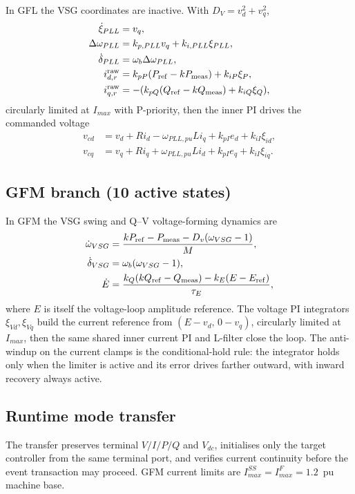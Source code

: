 \documentclass[12pt,a4paper]{article}
\begin{document}
In GFL the VSG coordinates are inactive.  With $D_V=v_d^2+v_q^2$,
\begin{align}
\dot\xi_{PLL}&=v_q,\\
\Delta\omega_{PLL}&=k_{p,PLL}v_q+k_{i,PLL}\xi_{PLL},\\
\dot\delta_{PLL}&=\omega_b\Delta\omega_{PLL},\\
i_{d,r}^{\rm raw}&=k_{pP}(P_{\rm ref}-k P_{\rm meas})+k_{iP}\xi_P,\\
i_{q,r}^{\rm raw}&=-(k_{pQ}(Q_{\rm ref}-k Q_{\rm meas})+k_{iQ}\xi_Q),
\end{align}
circularly limited at $I_{max}$ with P-priority, then the inner PI drives the
commanded voltage
\begin{align}
v_{cd}&=v_d+R i_d-\omega_{PLL,pu}L i_q+k_{pI}e_d+k_{iI}\xi_{id},\\
v_{cq}&=v_q+R i_q+\omega_{PLL,pu}L i_d+k_{pI}e_q+k_{iI}\xi_{iq}.
\end{align}

\subsection{GFM branch (10 active states)}

In GFM the VSG swing and Q--V voltage-forming dynamics are
\begin{align}
\dot\omega_{VSG}&=\frac{k P_{\rm ref}-P_{\rm meas}-D_v(\omega_{VSG}-1)}{M},\\
\dot\delta_{VSG}&=\omega_b(\omega_{VSG}-1),\\
\dot E&=\frac{k_Q(k Q_{\rm ref}-Q_{\rm meas})-k_E(E-E_{\rm ref})}{\tau_E},
\end{align}
where $E$ is itself the voltage-loop amplitude reference.  The voltage PI
integrators $\xi_{Vd},\xi_{Vq}$ build the current reference from
$(E-v_d,\,0-v_q)$, circularly limited at $I_{max}$, then the same shared
inner current PI and L-filter close the loop.  The anti-windup on the current
clamps is the conditional-hold rule: the integrator holds only when the
limiter is active and its error drives farther outward, with inward recovery
always active.

\subsection{Runtime mode transfer}

The transfer preserves terminal $V/I/P/Q$ and $V_{dc}$, initialises only the
target controller from the same terminal port, and verifies current
continuity before the event transaction may proceed.  GFM current limits are
$I_{max}^{SS}=I_{max}^{F}=1.2$~pu machine base.
\end{document}
